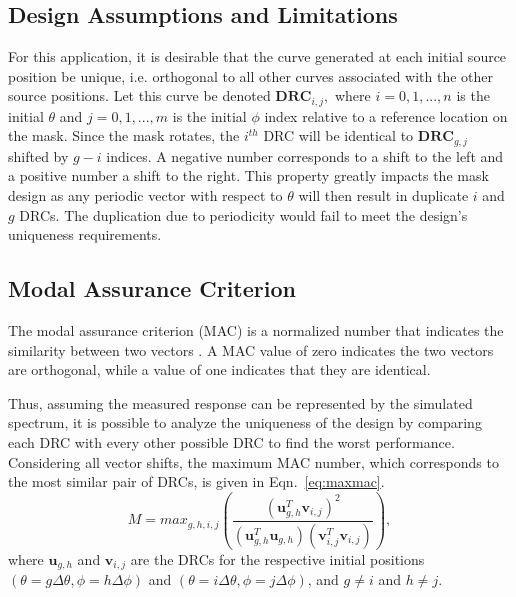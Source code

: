 \documentclass[twocolumn,10pt,final]{asme2ej}
\begin{document}
\vspace{-0.2 cm}
\subsection{Design Assumptions and Limitations}
For this application, it is desirable that the curve generated at each initial source position be unique, i.e. orthogonal to all other curves associated with the other source positions.  
Let this curve be denoted $\mathbf{DRC}_{i,j},$ where $i=0,1,...,n$ is the initial $\theta$ and $j=0,1,...,m$ is the initial $\phi$ index relative to a reference location on the mask.  
Since the mask rotates, the $i^{th}$ DRC will be identical to $\mathbf{DRC}_{g,j}$ shifted by $g-i$ indices.  
A negative number corresponds to a shift to the left and a positive number a shift to the right.  
This property greatly impacts the mask design as any periodic vector with respect to $\theta$ will then result in duplicate $i$ and $g$ DRCs.  
The duplication due to periodicity would fail to meet the design's uniqueness requirements.

\vspace{-0.2 cm}
\subsection{Modal Assurance Criterion} \label{sec:MAC}
The modal assurance criterion (MAC) is a normalized number that indicates the similarity between two vectors \cite{Allemang03}.
A MAC value of zero indicates the two vectors are orthogonal, while a value of one indicates that they are identical.  

Thus, assuming the measured response can be represented by the simulated spectrum, it is possible to analyze the uniqueness of the design by comparing each DRC with every other possible DRC to find the worst performance.  Considering all vector shifts, the maximum MAC number, which corresponds to the most similar pair of DRCs, is given in Eqn.~\ref{eq:maxmac}.
\begin{equation}
M=max_{g,h,i,j}\left(\frac{\left(\mathbf{u}_{g,h}^T\mathbf{v}_{i,j}\right)^2}{\left(\mathbf{u}_{g,h}^T\mathbf{u}_{g,h}\right)\left(\mathbf{v}_{i,j}^T\mathbf{v}_{i,j}\right)}\right),
\label{eq:maxmac}
\end{equation}
\noindent where $\mathbf{u}_{g,h}$ and $\mathbf{v}_{i,j}$ are the DRCs for the respective initial positions $\left(\theta=g\Delta\theta,\phi=h\Delta\phi\right)$ and
$\left(\theta=i\Delta\theta,\phi=j\Delta\phi\right)$, and $g\neq i$ and $h\neq j$.
\end{document}
